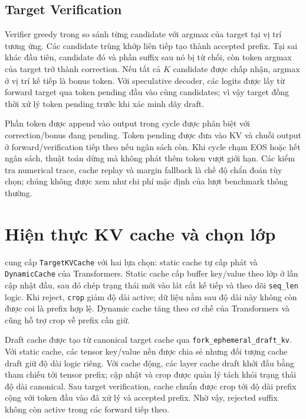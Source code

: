\subsection{Target Verification}
Verifier greedy trong  so sánh từng candidate với argmax của target tại vị trí tương ứng. Các candidate trùng khớp liên tiếp tạo thành accepted prefix. Tại sai khác đầu tiên, candidate đó và phần suffix sau nó bị từ chối, còn token argmax của target trở thành correction. Nếu tất cả \(K\) candidate được chấp nhận, argmax ở vị trí kế tiếp là bonus token. Với speculative decoder, các logits được lấy từ forward target qua token pending đầu vào cùng candidates; vì vậy target đồng thời xử lý token pending trước khi xác minh dãy draft.

Phần token được append vào output trong cycle được phân biệt với correction/bonus đang pending. Token pending được đưa vào KV và chuỗi output ở forward/verification tiếp theo nếu ngân sách còn. Khi cycle chạm EOS hoặc hết ngân sách, thuật toán dừng mà không phát thêm token vượt giới hạn. Các kiểm tra numerical trace, cache replay và margin fallback là chế độ chẩn đoán tùy chọn; chúng không được xem như chi phí mặc định của lượt benchmark thông thường.

\section{Hiện thực KV cache và chọn lớp}

 cung cấp \texttt{TargetKVCache} với hai lựa chọn: static cache tự cấp phát và \texttt{DynamicCache} của Transformers. Static cache cấp buffer key/value theo lớp ở lần cập nhật đầu, sau đó chép trạng thái mới vào lát cắt kế tiếp và theo dõi \texttt{seq\_len} logic. Khi reject, \texttt{crop} giảm độ dài active; dữ liệu nằm sau độ dài này không còn được coi là prefix hợp lệ. Dynamic cache tăng theo cơ chế của Transformers và cũng hỗ trợ crop về prefix cần giữ.

Draft cache được tạo từ canonical target cache qua \texttt{fork\_ephemeral\_draft\_kv}. Với static cache, các tensor key/value nền được chia sẻ nhưng đối tượng cache draft giữ độ dài logic riêng. Với cache động, các layer cache draft khởi đầu bằng tham chiếu tới tensor prefix; cập nhật và crop được quản lý tách khỏi trạng thái độ dài canonical. Sau target verification, cache chuẩn được crop tới độ dài prefix cộng với token đầu vào đã xử lý và accepted prefix. Nhờ vậy, rejected suffix không còn active trong các forward tiếp theo.

